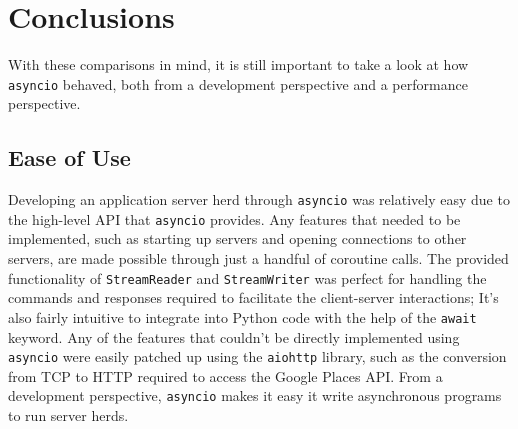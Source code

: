 \section{Conclusions}
\par
With these comparisons in mind, it is still important to take a look at how
\texttt{asyncio} behaved, both from a development perspective and a performance
perspective. 

\subsection{Ease of Use}
Developing an application server herd through \texttt{asyncio} was relatively
easy due to the high-level API that \texttt{asyncio} provides. Any features that
needed to be implemented, such as starting up servers and opening connections to
other servers, are made possible through just a handful of coroutine calls. The
provided functionality of \texttt{StreamReader} and \texttt{StreamWriter} was
perfect for handling the commands and responses required to facilitate the
client-server interactions; It's also fairly intuitive to integrate into Python
code with the help of the \texttt{await} keyword. Any of the features that
couldn't be directly implemented using \texttt{asyncio} were easily patched up
using the \texttt{aiohttp} library, such as the conversion from TCP to HTTP
required to access the Google Places API. From a development perspective,
\texttt{asyncio} makes it easy it write asynchronous programs to run server
herds.

